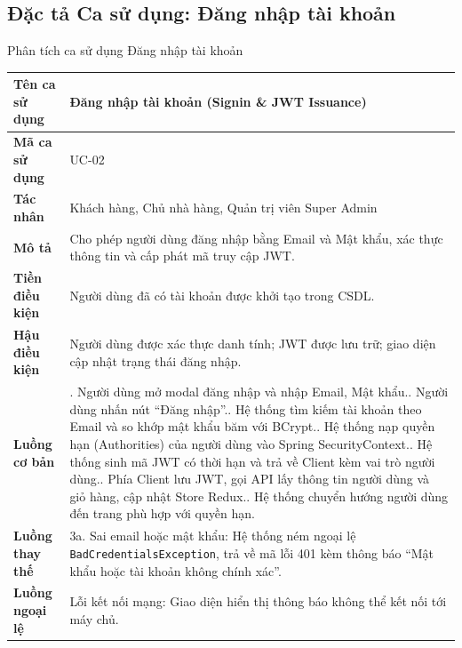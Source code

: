 \documentclass{uetgraduation}
\begin{document}
\subsection{Đặc tả Ca sử dụng: Đăng nhập tài khoản}
\begin{table}[!htbp]{Phân tích ca sử dụng Đăng nhập tài khoản}
\centering
\small
\begin{tabularx}{\textwidth}{|l|>{\raggedright\arraybackslash}X|}
\hline
\textbf{Tên ca sử dụng} & \textbf{Đăng nhập tài khoản (Signin \& JWT Issuance)} \\ \hline
\textbf{Mã ca sử dụng} & UC-02 \\ \hline
\textbf{Tác nhân} & Khách hàng, Chủ nhà hàng, Quản trị viên Super Admin \\ \hline
\textbf{Mô tả} & Cho phép người dùng đăng nhập bằng Email và Mật khẩu, xác thực thông tin và cấp phát mã truy cập JWT. \\ \hline
\textbf{Tiền điều kiện} & Người dùng đã có tài khoản được khởi tạo trong CSDL. \\ \hline
\textbf{Hậu điều kiện} & Người dùng được xác thực danh tính; JWT được lưu trữ; giao diện cập nhật trạng thái đăng nhập. \\ \hline
\textbf{Luồng cơ bản} & 
1. Người dùng mở modal đăng nhập và nhập Email, Mật khẩu.\newline
2. Người dùng nhấn nút ``Đăng nhập''.\newline
3. Hệ thống tìm kiếm tài khoản theo Email và so khớp mật khẩu băm với BCrypt.\newline
4. Hệ thống nạp quyền hạn (Authorities) của người dùng vào Spring SecurityContext.\newline
5. Hệ thống sinh mã JWT có thời hạn và trả về Client kèm vai trò người dùng.\newline
6. Phía Client lưu JWT, gọi API lấy thông tin người dùng và giỏ hàng, cập nhật Store Redux.\newline
7. Hệ thống chuyển hướng người dùng đến trang phù hợp với quyền hạn. \\ \hline
\textbf{Luồng thay thế} & 
3a. Sai email hoặc mật khẩu: Hệ thống ném ngoại lệ \texttt{BadCredentialsException}, trả về mã lỗi 401 kèm thông báo ``Mật khẩu hoặc tài khoản không chính xác''. \\ \hline
\textbf{Luồng ngoại lệ} & 
Lỗi kết nối mạng: Giao diện hiển thị thông báo không thể kết nối tới máy chủ. \\ \hline
\end{tabularx}
\end{table}
\end{document}
